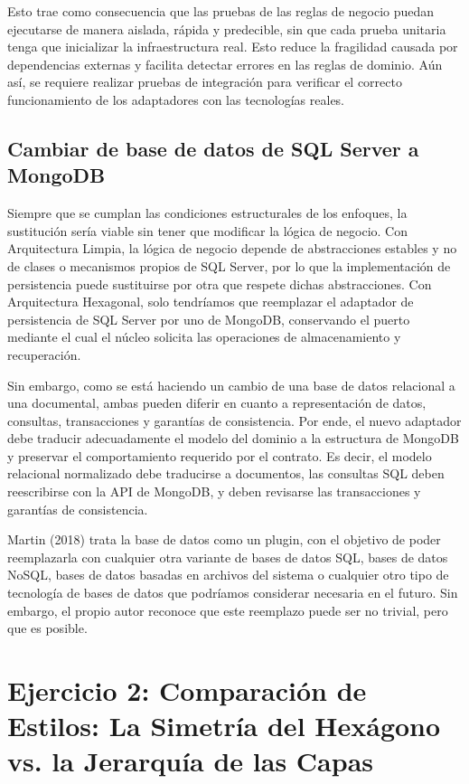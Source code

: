 \documentclass[12pt, a4paper]{article}
\begin{document}
        Esto trae como consecuencia que las pruebas de las reglas de negocio puedan ejecutarse de manera aislada, rápida y predecible, sin que cada prueba unitaria tenga que inicializar la infraestructura real. Esto reduce la fragilidad causada por dependencias externas y facilita detectar errores en las reglas de dominio. Aún así, se requiere realizar pruebas de integración para verificar el correcto funcionamiento de los adaptadores con las tecnologías reales.

        \subsection{Cambiar de base de datos de SQL Server a MongoDB}
        Siempre que se cumplan las condiciones estructurales de los enfoques, la sustitución sería viable sin tener que modificar la lógica de negocio. Con Arquitectura Limpia, la lógica de negocio depende de abstracciones estables y no de clases o mecanismos propios de SQL Server, por lo que la implementación de persistencia puede sustituirse por otra que respete dichas abstracciones. Con Arquitectura Hexagonal, solo tendríamos que reemplazar el adaptador de persistencia de SQL Server por uno de MongoDB, conservando el puerto mediante el cual el núcleo solicita las operaciones de almacenamiento y recuperación.

        Sin embargo, como se está haciendo un cambio de una base de datos relacional a una documental, ambas pueden diferir en cuanto a representación de datos, consultas, transacciones y garantías de consistencia. Por ende, el nuevo adaptador debe traducir adecuadamente el modelo del dominio a la estructura de MongoDB y preservar el comportamiento requerido por el contrato. Es decir, el modelo relacional normalizado debe traducirse a documentos, las consultas SQL deben reescribirse con la API de MongoDB, y deben revisarse las transacciones y garantías de consistencia.

        Martin (2018) trata la base de datos como un plugin, con el objetivo de poder reemplazarla con cualquier otra variante de bases de datos SQL, bases de datos NoSQL, bases de datos basadas en archivos del sistema o cualquier otro tipo de tecnología de bases de datos que podríamos considerar necesaria en el futuro. Sin embargo, el propio autor reconoce que este reemplazo puede ser no trivial, pero que es posible.

        \section[Comparación de Estilos: La Simetría del Hexágono vs. la Jerarquía de las Capas]{Ejercicio 2: Comparación de Estilos: La Simetría del Hexágono vs. la Jerarquía de las Capas}
\end{document}
